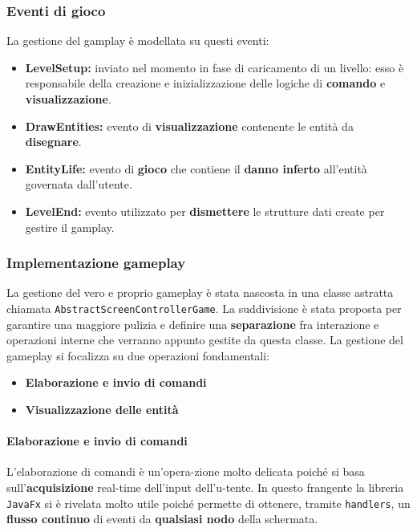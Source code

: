 \subsubsection{Eventi di gioco}
La gestione del gamplay è modellata su questi eventi:
\begin{itemize}
	\item{\textbf{LevelSetup:}} inviato nel momento in fase di caricamento di un livello: esso è responsabile della creazione e inizializzazione delle logiche di \textbf{comando} e \textbf{visualizzazione}.
	\item{\textbf{DrawEntities:}} evento di \textbf{visualizzazione} contenente le entità da \textbf{disegnare}.
	\item{\textbf{EntityLife:}} evento di \textbf{gioco} che contiene il \textbf{danno inferto} all'entità governata dall'utente.
	\item{\textbf{LevelEnd:}} evento utilizzato per \textbf{dismettere} le strutture dati create per gestire il gamplay.
\end{itemize}

\subsubsection{Implementazione gameplay}
La gestione del vero e proprio gameplay è stata nascosta in una classe astratta chiamata \texttt{AbstractScreenControllerGame}. La suddivisione è stata proposta per garantire una maggiore pulizia e definire una \textbf{separazione} fra interazione e operazioni interne che verranno appunto gestite da questa classe. La gestione del gameplay si focalizza su due operazioni fondamentali:
\begin{itemize}
	\item{\textbf{Elaborazione e invio di comandi}}
	\item{\textbf{Visualizzazione delle entità}}
\end{itemize}

\paragraph{Elaborazione e invio di comandi}
L'elaborazione di comandi è un'opera-zione molto delicata poiché si basa sull'\textbf{acquisizione} real-time dell'input dell'u-tente. In questo frangente la libreria \texttt{JavaFx} si è rivelata molto utile poiché permette di ottenere, tramite \texttt{handlers}, un \textbf{flusso continuo} di eventi da \textbf{qualsiasi nodo} della schermata.

